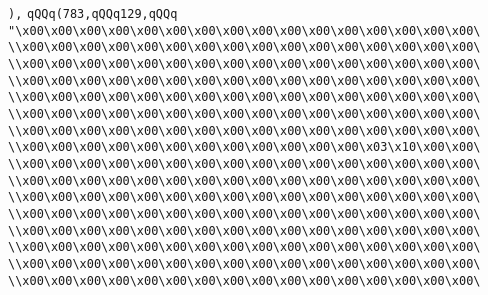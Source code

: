 \verb|),|\newline
\verb|qQQq(783,qQQq129,qQQq|\newline
\verb|"\x00\x00\x00\x00\x00\x00\x00\x00\x00\x00\x00\x00\x00\x00\x00\x00\|\newline
\verb|\\x00\x00\x00\x00\x00\x00\x00\x00\x00\x00\x00\x00\x00\x00\x00\x00\|\newline
\verb|\\x00\x00\x00\x00\x00\x00\x00\x00\x00\x00\x00\x00\x00\x00\x00\x00\|\newline
\verb|\\x00\x00\x00\x00\x00\x00\x00\x00\x00\x00\x00\x00\x00\x00\x00\x00\|\newline
\verb|\\x00\x00\x00\x00\x00\x00\x00\x00\x00\x00\x00\x00\x00\x00\x00\x00\|\newline
\verb|\\x00\x00\x00\x00\x00\x00\x00\x00\x00\x00\x00\x00\x00\x00\x00\x00\|\newline
\verb|\\x00\x00\x00\x00\x00\x00\x00\x00\x00\x00\x00\x00\x00\x00\x00\x00\|\newline
\verb|\\x00\x00\x00\x00\x00\x00\x00\x00\x00\x00\x00\x00\x03\x10\x00\x00\|\newline
\verb|\\x00\x00\x00\x00\x00\x00\x00\x00\x00\x00\x00\x00\x00\x00\x00\x00\|\newline
\verb|\\x00\x00\x00\x00\x00\x00\x00\x00\x00\x00\x00\x00\x00\x00\x00\x00\|\newline
\verb|\\x00\x00\x00\x00\x00\x00\x00\x00\x00\x00\x00\x00\x00\x00\x00\x00\|\newline
\verb|\\x00\x00\x00\x00\x00\x00\x00\x00\x00\x00\x00\x00\x00\x00\x00\x00\|\newline
\verb|\\x00\x00\x00\x00\x00\x00\x00\x00\x00\x00\x00\x00\x00\x00\x00\x00\|\newline
\verb|\\x00\x00\x00\x00\x00\x00\x00\x00\x00\x00\x00\x00\x00\x00\x00\x00\|\newline
\verb|\\x00\x00\x00\x00\x00\x00\x00\x00\x00\x00\x00\x00\x00\x00\x00\x00\|\newline
\verb|\\x00\x00\x00\x00\x00\x00\x00\x00\x00\x00\x00\x00\x00\x00\x00\x00\|\newline
